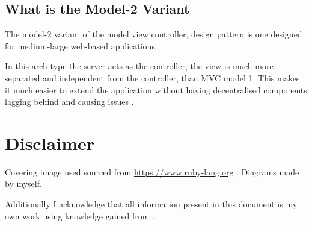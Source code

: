 \documentclass[a4paper]{article}
\begin{document}
\subsection{What is the Model-2 Variant}
\label{sec-2-2}
The model-2 variant of the model view controller, design pattern is one designed for 
medium-large web-based applications \cite{Model1an89:online}.

In this arch-type the server acts as the controller, the view is much more separated and independent
from the controller, than MVC model 1. This makes it much easier to extend the application without
having decentralised components lagging behind and causing issues \cite{javaWhat73:online}. 

\section{Disclaimer}
\label{sec-3}
Covering image used sourced from \url{https://www.ruby-lang.org} \cite{RubyProg39:online}. Diagrams 
made by myself. 

Additionally I acknowledge that all information present in this document is my own work using knowledge
gained from \cite{RubyonRa5:online,RubyProg39:online,javaWhat73:online,loftus17_requir_cs_alumn_applic,Model1an89:online}.



\end{document}
